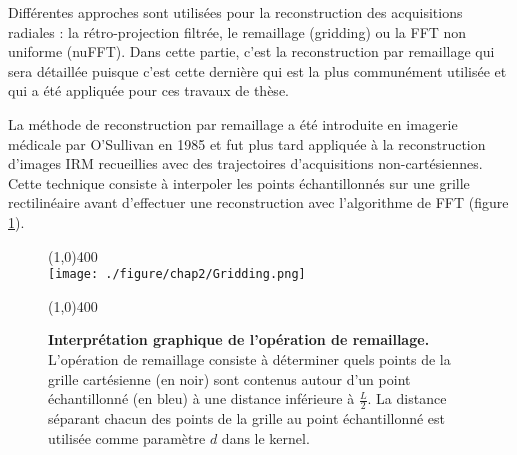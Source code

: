 \label{subsec:reconstruction}
Différentes approches sont utilisées pour la reconstruction des acquisitions radiales : la rétro-projection filtrée, le remaillage (gridding) ou la FFT non uniforme (nuFFT). Dans cette partie, c'est la reconstruction par remaillage qui sera détaillée puisque c'est cette dernière qui est la plus communément utilisée et qui a été appliquée pour ces travaux de thèse.

La méthode de reconstruction par remaillage a été introduite en imagerie médicale par O'Sullivan en 1985 \cite{o1985fast} et fut plus tard appliquée à la reconstruction d'images IRM recueillies avec des trajectoires d'acquisitions non-cartésiennes. Cette technique consiste à interpoler les points échantillonnés sur une grille rectilinéaire avant d'effectuer une reconstruction avec l'algorithme de FFT (figure \ref{fig:Gridding}).

\begin{figure}[h]
\centering
\line(1,0){400} \\
\texttt{[image: ./figure/chap2/Gridding.png]}
\caption[Interprétation graphique de l'opération de remaillage.]{\label{fig:Gridding} \textbf{Interprétation graphique de l'opération de remaillage.} L'opération de remaillage consiste à déterminer quels points de la grille cartésienne (en noir) sont contenus autour d'un point échantillonné (en bleu) à une distance inférieure à $\frac{L}{2}$. La distance séparant chacun des points de la grille au point échantillonné est utilisée comme paramètre $d$ dans le kernel.} 
\line(1,0){400} \\
\end{figure}


